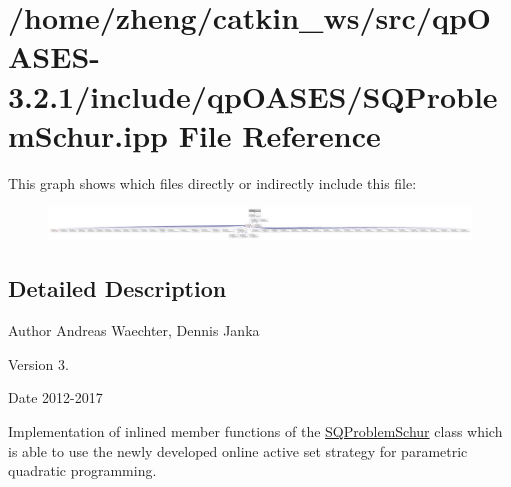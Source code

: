 \hypertarget{_s_q_problem_schur_8ipp}{}\section{/home/zheng/catkin\+\_\+ws/src/qp\+O\+A\+S\+E\+S-\/3.2.1/include/qp\+O\+A\+S\+E\+S/\+S\+Q\+Problem\+Schur.ipp File Reference}
\label{_s_q_problem_schur_8ipp}
This graph shows which files directly or indirectly include this file\+:
\nopagebreak
\begin{figure}[H]
\begin{center}
\leavevmode
\includegraphics[width=350pt]{_s_q_problem_schur_8ipp__dep__incl}
\end{center}
\end{figure}


\subsection{Detailed Description}
\begin{DoxyAuthor}{Author}
Andreas Waechter, Dennis Janka 
\end{DoxyAuthor}
\begin{DoxyVersion}{Version}
3. 
\end{DoxyVersion}
\begin{DoxyDate}{Date}
2012-\/2017
\end{DoxyDate}
Implementation of inlined member functions of the \hyperlink{class_s_q_problem_schur}{S\+Q\+Problem\+Schur} class which is able to use the newly developed online active set strategy for parametric quadratic programming. 